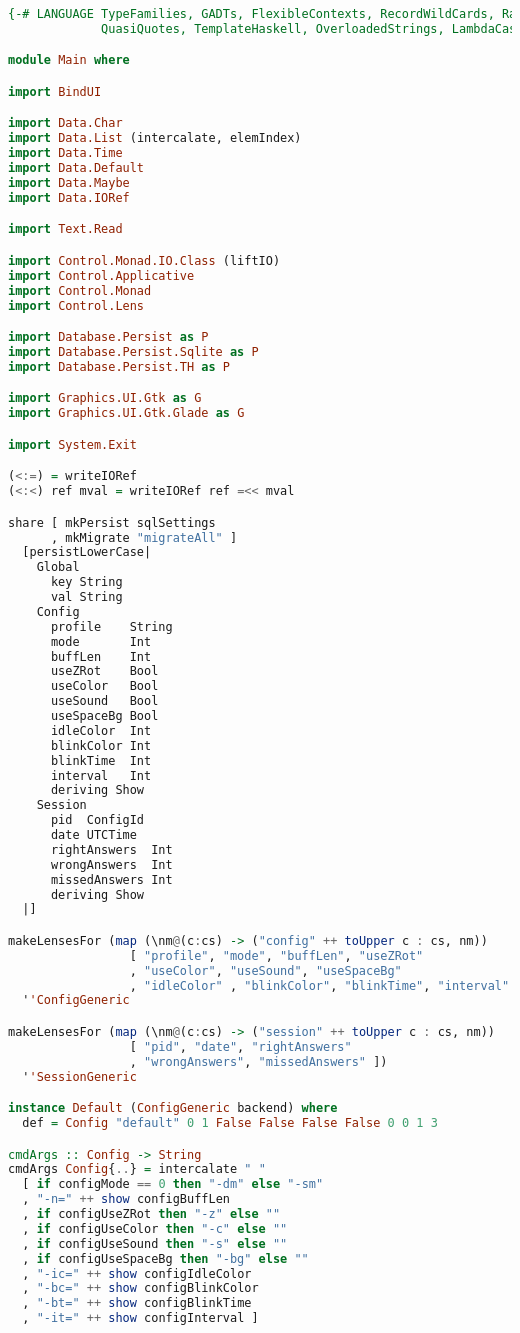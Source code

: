 \begin{lstlisting}[language=Haskell,caption=MemspacerUI.hs]
{-# LANGUAGE TypeFamilies, GADTs, FlexibleContexts, RecordWildCards, RankNTypes,
             QuasiQuotes, TemplateHaskell, OverloadedStrings, LambdaCase #-}

module Main where

import BindUI

import Data.Char
import Data.List (intercalate, elemIndex)
import Data.Time
import Data.Default
import Data.Maybe
import Data.IORef

import Text.Read

import Control.Monad.IO.Class (liftIO)
import Control.Applicative
import Control.Monad
import Control.Lens

import Database.Persist as P
import Database.Persist.Sqlite as P
import Database.Persist.TH as P

import Graphics.UI.Gtk as G
import Graphics.UI.Gtk.Glade as G

import System.Exit

(<:=) = writeIORef
(<:<) ref mval = writeIORef ref =<< mval

share [ mkPersist sqlSettings
      , mkMigrate "migrateAll" ]
  [persistLowerCase|
    Global
      key String
      val String
    Config
      profile    String
      mode       Int
      buffLen    Int
      useZRot    Bool
      useColor   Bool
      useSound   Bool
      useSpaceBg Bool
      idleColor  Int
      blinkColor Int
      blinkTime  Int
      interval   Int
      deriving Show
    Session
      pid  ConfigId
      date UTCTime
      rightAnswers  Int
      wrongAnswers  Int
      missedAnswers Int
      deriving Show
  |]

makeLensesFor (map (\nm@(c:cs) -> ("config" ++ toUpper c : cs, nm))
                 [ "profile", "mode", "buffLen", "useZRot"
                 , "useColor", "useSound", "useSpaceBg"
                 , "idleColor" , "blinkColor", "blinkTime", "interval" ])
  ''ConfigGeneric

makeLensesFor (map (\nm@(c:cs) -> ("session" ++ toUpper c : cs, nm))
                 [ "pid", "date", "rightAnswers"
                 , "wrongAnswers", "missedAnswers" ])
  ''SessionGeneric

instance Default (ConfigGeneric backend) where
  def = Config "default" 0 1 False False False False 0 0 1 3

cmdArgs :: Config -> String
cmdArgs Config{..} = intercalate " "
  [ if configMode == 0 then "-dm" else "-sm"
  , "-n=" ++ show configBuffLen
  , if configUseZRot then "-z" else ""
  , if configUseColor then "-c" else ""
  , if configUseSound then "-s" else ""
  , if configUseSpaceBg then "-bg" else ""
  , "-ic=" ++ show configIdleColor
  , "-bc=" ++ show configBlinkColor
  , "-bt=" ++ show configBlinkTime
  , "-it=" ++ show configInterval ]


\end{lstlisting}
